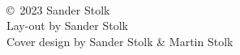 \thispagestyle{empty}

~ 
\vfill

\noindent \copyright ~2023 Sander Stolk\\[0.1cm] 


\noindent Lay-out by Sander Stolk \\
\noindent Cover design by Sander Stolk \& Martin Stolk\\



\clearpage